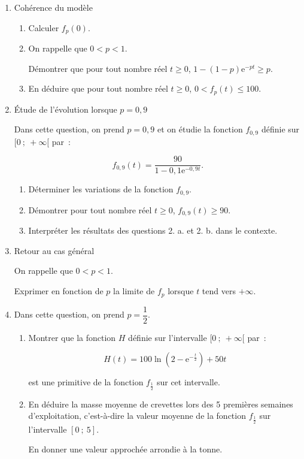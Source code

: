 \begin{enumerate}
     \item Cohérence du modèle
     \begin{enumerate}[label=\alph*.]
          \item Calculer $f_p(0)$.
          \item On rappelle que $0 < p < 1$.
          \par
          Démontrer que pour tout nombre réel $t \geqslant 0$,\: $1 - (1 - p)\text{e}^{- pt} \geqslant p$.
          \item En déduire que pour tout nombre réel $t \geqslant 0$,\: $0 < f_p(t) \leqslant  100$.
     \end{enumerate}
     \item  Étude de l'évolution lorsque $p = 0,9$
     \par
     Dans cette question, on prend $p = 0,9$ et on étudie la fonction $f_{0,9}$ définie sur $[0~;~ +\infty[$ par~:
     \par
     \par
     \[f_{0,9}(t) = \dfrac{90}{1 - 0,1 \text{e}^{- 0,9t}}.\]
     \begin{enumerate}[label=\alph*.]
          \item Déterminer les variations de la fonction $f_{0,9}$.
          \item Démontrer pour tout nombre réel $t \geqslant 0$,\: $f_{0,9}(t) \geqslant 90$.
          \item Interpréter les résultats des questions 2. a. et 2. b. dans le contexte.
     \end{enumerate}
     \item  Retour au cas général
     \par
     On rappelle que $0 < p < 1$.
     \par
     Exprimer en fonction de $p$ la limite de $f_p$ lorsque $t$ tend vers $+ \infty$.
     \item  Dans cette question, on prend $p = \dfrac{1}{2}$.
     \begin{enumerate}[label=\alph*.]
          \item Montrer que la fonction $H$ définie sur l'intervalle $[0~;~ +\infty[$ par~:
          \par
          \[H(t) = 100\ln \left(2 - \text{e}^{- \frac{t}{2}}\right) + 50t\]
          \par
          est une primitive de la fonction $f_{\frac{1}{2}}$ sur cet intervalle.
          \item En déduire la masse moyenne de crevettes lors des 5 premières semaines d'exploitation, c'est-à-dire la valeur moyenne de la fonction $f_{\frac{1}{2}}$ sur l'intervalle $[0~;~5].$
          \par
          En donner une valeur approchée arrondie à la tonne.
     \end{enumerate}
\end{enumerate}

